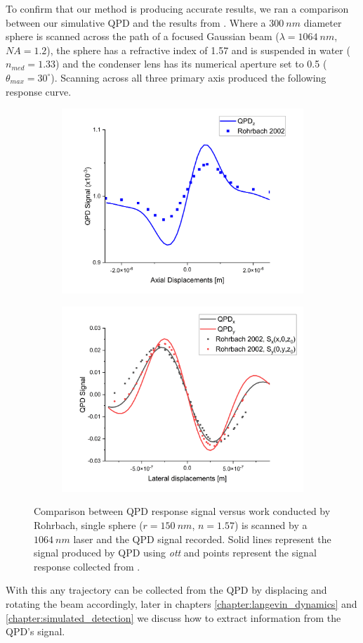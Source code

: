 To confirm that our method is producing accurate results, we ran a comparison
between our simulative QPD and the results from \cite{Rohrbach2002}. Where a 
$300\ nm$ diameter sphere is scanned across the path of a focused Gaussian beam
($\lambda=1064\ nm$, $NA=1.2$), the sphere has a refractive index of 1.57 and is
suspended in water ($n_{med}=1.33$) and the condenser lens has its numerical aperture
set to 0.5 ($\theta_{max} = 30^\circ$). Scanning across all three primary axis 
produced the following response curve.
\begin{figure}[h!]
	\begin{subfigure}{0.475 \linewidth}
		\subcaption{}
		\includegraphics[width=\linewidth]{QPD_axial_tests.png}
	\end{subfigure}
	\begin{subfigure}{0.475 \linewidth}
		\subcaption{}
		\includegraphics[width=\linewidth]{QPD_lat_tests.png}
	\end{subfigure}
	\caption{Comparison between QPD response signal versus work conducted by Rohrbach, single sphere ($r = 150\ nm$, $n=1.57$) is scanned by a $1064\ nm$ laser and the QPD signal recorded. Solid lines represent the signal produced by QPD using \textit{ott} and points represent the signal response collected from \cite{Rohrbach2002}.}
	\label{fig:Rohrbach}
\end{figure}

With this any trajectory can be collected from the QPD by displacing and 
rotating the beam accordingly, later in chapters \ref{chapter:langevin_dynamics} 
and \ref{chapter:simulated_detection} we discuss how to extract information 
from the QPD's signal.
